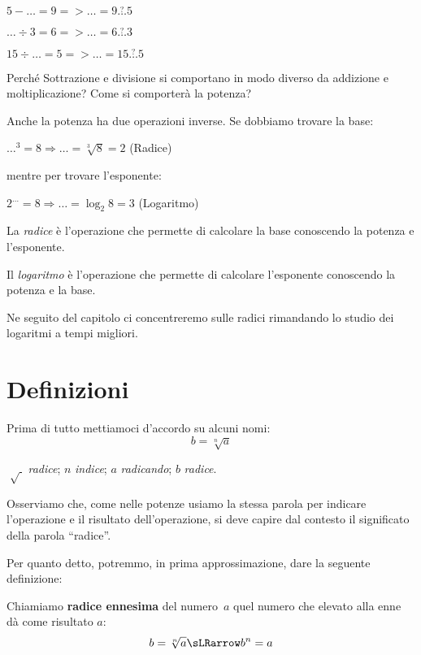 $5 - \dots = 9 => \dots = 9 \overset{?}{\dots} 5$

$\dots \div 3 = 6 => \dots = 6 \overset{?}{\dots} 3$

$15 \div \dots = 5 => \dots = 15 \overset{?}{\dots} 5$

Perché Sottrazione e divisione si comportano in modo diverso da addizione e 
moltiplicazione? Come si comporterà la potenza?

Anche la potenza ha due operazioni inverse. Se dobbiamo trovare la base:

$\dots ^3 = 8 \Rightarrow \dots = \sqrt[3]{8} = 2$ (Radice)

mentre per trovare l'esponente:

$2 ^{\dots} = 8 \Rightarrow \dots = \log_{2}{8} = 3$ (Logaritmo)

\begin{definizione}
La \emph{radice} è l'operazione che permette di calcolare la base conoscendo
la potenza e l'esponente.
\end{definizione}

\begin{definizione}
Il \emph{logaritmo} è l'operazione che permette di calcolare l'esponente
conoscendo la potenza e la base.
\end{definizione}

Ne seguito del capitolo ci concentreremo sulle radici rimandando lo studio
dei logaritmi a tempi migliori. 

\section{Definizioni}
\label{sec:radici_definizioni}
Prima di tutto mettiamoci d'accordo su alcuni nomi:
\large
\[b=\sqrt[n]{a}\]
\begin{center} 
\(\sqrt[]{~}\) \quad \emph{radice}; \quad
\(n\) \quad \emph{indice}; \quad
\(a\) \quad \emph{radicando}; \quad
\(b\) \quad \emph{radice}.
\end{center}
\normalsize
Osserviamo che, come nelle potenze usiamo la stessa parola per indicare 
l'operazione e il risultato dell'operazione, si deve capire dal contesto il 
significato della parola ``radice''.

Per quanto detto, potremmo, in prima approssimazione,  dare la seguente 
definizione: 

\begin{definizione}
Chiamiamo \textbf{radice ennesima} del numero~$a$ quel numero che 
elevato alla enne dà come risultato $a$:
 \[b=\sqrt[n]{a} \sLRarrow b^n=a\]
\end{definizione}

